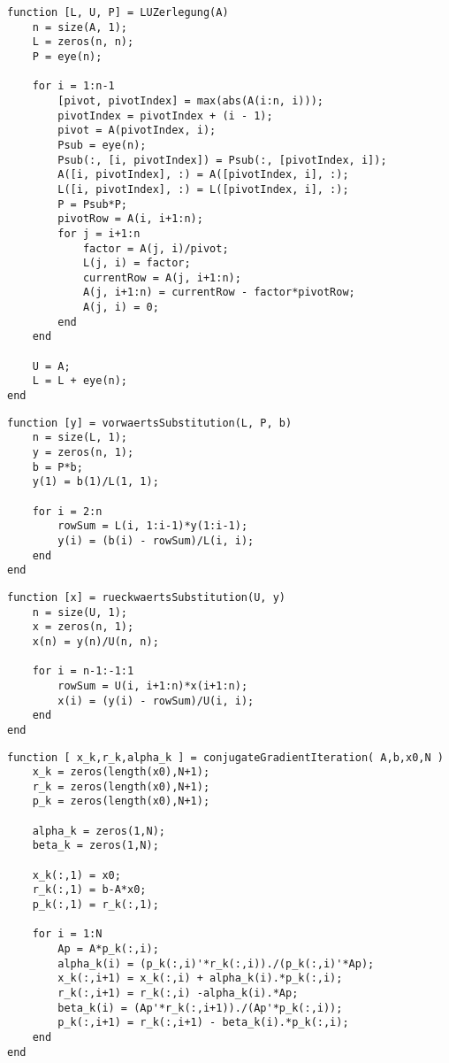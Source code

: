 \documentclass[german]{latex4ei/latex4ei_fs}
\begin{document}
\begin{lstlisting}
function [L, U, P] = LUZerlegung(A)
    n = size(A, 1);
    L = zeros(n, n);
    P = eye(n);

    for i = 1:n-1
        [pivot, pivotIndex] = max(abs(A(i:n, i)));
        pivotIndex = pivotIndex + (i - 1);
        pivot = A(pivotIndex, i);
        Psub = eye(n);
        Psub(:, [i, pivotIndex]) = Psub(:, [pivotIndex, i]);
        A([i, pivotIndex], :) = A([pivotIndex, i], :);
        L([i, pivotIndex], :) = L([pivotIndex, i], :);
        P = Psub*P;
        pivotRow = A(i, i+1:n);
        for j = i+1:n
            factor = A(j, i)/pivot;
            L(j, i) = factor;
            currentRow = A(j, i+1:n);
            A(j, i+1:n) = currentRow - factor*pivotRow;
            A(j, i) = 0;
        end
    end

    U = A;
    L = L + eye(n);
end
\end{lstlisting}

\begin{lstlisting}
function [y] = vorwaertsSubstitution(L, P, b)
    n = size(L, 1);
    y = zeros(n, 1);
    b = P*b;
    y(1) = b(1)/L(1, 1);

    for i = 2:n
        rowSum = L(i, 1:i-1)*y(1:i-1);
        y(i) = (b(i) - rowSum)/L(i, i);
    end
end
\end{lstlisting}

\begin{lstlisting}
function [x] = rueckwaertsSubstitution(U, y)
    n = size(U, 1);
    x = zeros(n, 1);
    x(n) = y(n)/U(n, n);

    for i = n-1:-1:1
        rowSum = U(i, i+1:n)*x(i+1:n);
        x(i) = (y(i) - rowSum)/U(i, i);
    end
end
\end{lstlisting}

\begin{lstlisting}
function [ x_k,r_k,alpha_k ] = conjugateGradientIteration( A,b,x0,N )
    x_k = zeros(length(x0),N+1);
    r_k = zeros(length(x0),N+1);
    p_k = zeros(length(x0),N+1);

    alpha_k = zeros(1,N);
    beta_k = zeros(1,N);

    x_k(:,1) = x0;
    r_k(:,1) = b-A*x0;
    p_k(:,1) = r_k(:,1);

    for i = 1:N
        Ap = A*p_k(:,i);
        alpha_k(i) = (p_k(:,i)'*r_k(:,i))./(p_k(:,i)'*Ap);
        x_k(:,i+1) = x_k(:,i) + alpha_k(i).*p_k(:,i);
        r_k(:,i+1) = r_k(:,i) -alpha_k(i).*Ap;
        beta_k(i) = (Ap'*r_k(:,i+1))./(Ap'*p_k(:,i));
        p_k(:,i+1) = r_k(:,i+1) - beta_k(i).*p_k(:,i);
    end
end
\end{lstlisting}
\end{document}
